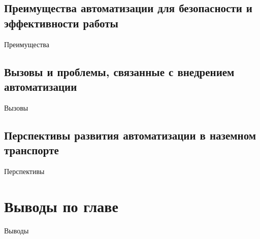 \subsection{Преимущества автоматизации для безопасности и эффективности работы}\label{subsec:ch1/sec3/sub1}

Преимущества

\subsection{Вызовы и проблемы, связанные с внедрением автоматизации}\label{subsec:ch1/sec3/sub2}

Вызовы

\subsection{Перспективы развития автоматизации в наземном транспорте}\label{subsec:ch1/sec3/sub3}

Перспективы

\section{Выводы по главе}\label{sec:ch1/sec4}

Выводы

\FloatBarrier
